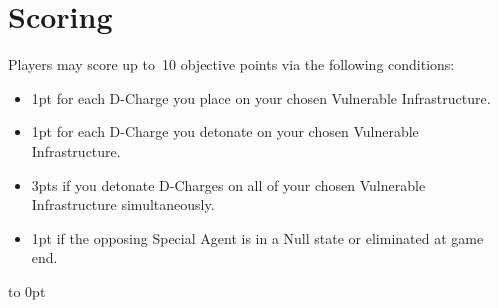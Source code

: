 \section{Scoring}

Players may score up to~10 objective points via the following
conditions:
\begin{itemize}\shortlist
\item 1pt for each D-Charge you place on your chosen Vulnerable
  Infrastructure.
\item 1pt for each D-Charge you detonate on your chosen Vulnerable
  Infrastructure.
\item 3pts if you detonate D-Charges on all of your chosen Vulnerable
  Infrastructure simultaneously.

\item 1pt if the opposing Special Agent is in a Null state or
  eliminated at game end.
\end{itemize}

\vfill
\vbox to 0pt{}